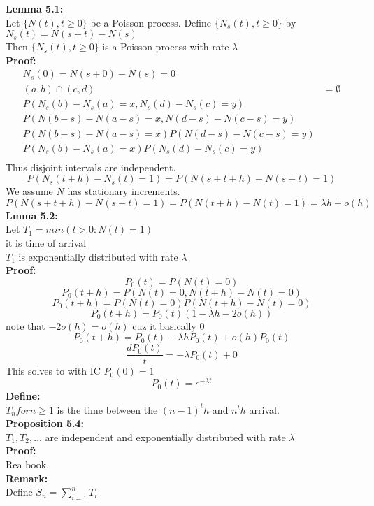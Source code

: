 \documentclass{article}
\begin{document}
\textbf{Lemma 5.1:}\\
Let $\{N(t), t \geq 0\}$ be a Poisson process. Define $\{N_s(t), t \geq 0 \}$ by $N_s(t) = N(s+t) - N(s)$\\
Then $\{N_s(t), t \geq 0\}$ is a Poisson process with rate $\lambda$\\
\textbf{Proof:}\\
\begin{align*}
    N_s(0) = N(s+0) - N(s) = 0\\
    (a,b) \cap (c,d) &= \emptyset \\
    P(N_s(b) - N_s(a) = x,  N_s(d) - N_s(c) = y)\\
    P(N(b-s) - N(a-s) = x, N(d-s) - N(c-s) = y)\\
    P(N(b-s) - N(a-s) = x)P(N(d-s) - N(c-s) = y)\\
    P(N_s(b) - N_s(a) = x)P(N_s(d) - N_s(c) = y)\\
\end{align*}
Thus disjoint intervals are independent.\\
$$P(N_s(t+h) - N_s(t) = 1) = P(N(s+t+h) - N(s+t) = 1) $$
We assume $N$ has stationary increments.\\
$$P(N(s+t+h) - N(s+t) = 1) = P(N(t+h) - N(t) = 1) = \lambda h + o(h)$$
\textbf{Lmma 5.2:}\\
Let $T_1 = min(t > 0 : N(t) = 1)$\\
it is time of arrival\\
$T_1$ is exponentially distributed with rate $\lambda$\\
\textbf{Proof:}\\
$$P_0(t) = P(N(t) = 0)$$
$$P_0(t+h) = P(N(t) = 0 , N(t+h) - N(t) = 0) $$
$$P_0(t+h) = P(N(t) = 0)P(N(t+h) - N(t) = 0)$$
$$P_0(t+h) = P_0(t)(1 - \lambda h - 2o(h))$$
note that $-2o(h) = o(h)$ cuz it basically 0 
$$P_0(t+h) = P_0(t) - \lambda h P_0(t) + o(h)P_0(t)$$
$$\frac{d P_0(t)}{t} = -\lambda P_0(t) + 0$$
This solves to with IC $P_0(0) = 1$ 
$$P_0(t) = e^{-\lambda t}$$
\textbf{Define:}\\
$T_n for n \geq 1$ is the time between the $(n-1)^th$ and $n^th$ arrival.\\
\textbf{Proposition 5.4:}\\
$T_1, T_2, \dots$ are independent and exponentially distributed with rate $\lambda$\\
\textbf{Proof:}\\
Rea book.\\ 
\textbf{Remark:}\\
Define $S_n = \sum_{i=1}^{n} T_i$\\
\end{document}
